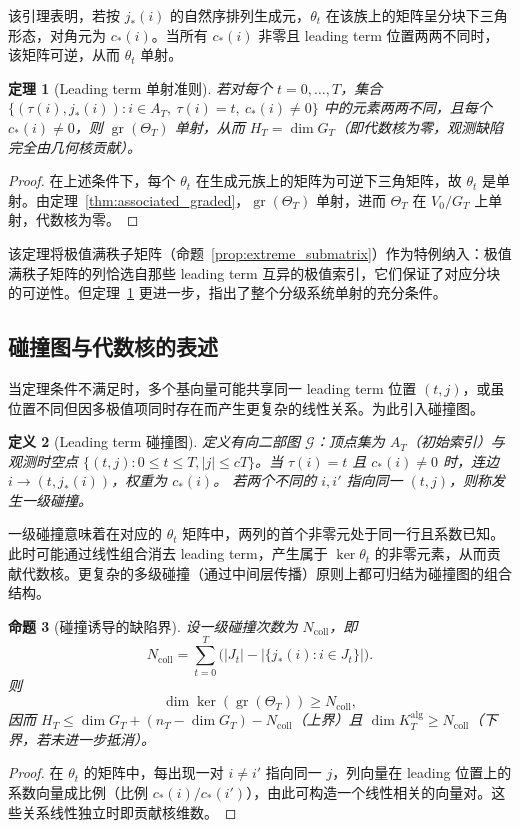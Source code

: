 \documentclass[11pt,a4paper]{ctexart}
\newtheorem{theorem}{定理}[section]
\newtheorem{proposition}[theorem]{命题}
\newtheorem{definition}[theorem]{定义}
\DeclareMathOperator{\gr}{gr}
\begin{document}
该引理表明，若按 \(j_*(i)\) 的自然序排列生成元，\(\theta_t\) 在该族上的矩阵呈分块下三角形态，对角元为 \(c_*(i)\)。当所有 \(c_*(i)\) 非零且 leading term 位置两两不同时，该矩阵可逆，从而 \(\theta_t\) 单射。

\begin{theorem}[Leading term 单射准则]\label{thm:leading_term_injective}
若对每个 \(t=0,\dots,T\)，集合 \(\{ (\tau(i), j_*(i)) : i\in A_T,\ \tau(i)=t,\ c_*(i)\neq0\}\) 中的元素两两不同，且每个 \(c_*(i)\neq0\)，则 \(\gr(\Theta_T)\) 单射，从而 \(H_T = \dim G_T\)（即代数核为零，观测缺陷完全由几何核贡献）。
\end{theorem}
\begin{proof}
在上述条件下，每个 \(\theta_t\) 在生成元族上的矩阵为可逆下三角矩阵，故 \(\theta_t\) 是单射。由定理~\ref{thm:associated_graded}，\(\gr(\Theta_T)\) 单射，进而 \(\Theta_T\) 在 \(V_0/G_T\) 上单射，代数核为零。
\end{proof}

该定理将极值满秩子矩阵（命题~\ref{prop:extreme_submatrix}）作为特例纳入：极值满秩子矩阵的列恰选自那些 leading term 互异的极值索引，它们保证了对应分块的可逆性。但定理~\ref{thm:leading_term_injective} 更进一步，指出了整个分级系统单射的充分条件。

\subsection{碰撞图与代数核的表述}
当定理条件不满足时，多个基向量可能共享同一 leading term 位置 \((t,j)\)，或虽位置不同但因多极值项同时存在而产生更复杂的线性关系。为此引入碰撞图。

\begin{definition}[Leading term 碰撞图]
定义有向二部图 \(\mathcal{G}\)：顶点集为 \(A_T\)（初始索引）与观测时空点 \(\{(t,j): 0\le t\le T, |j|\le cT\}\)。当 \(\tau(i)=t\) 且 \(c_*(i)\neq0\) 时，连边 \(i \to (t, j_*(i))\)，权重为 \(c_*(i)\)。
若两个不同的 \(i,i'\) 指向同一 \((t,j)\)，则称发生\emph{一级碰撞}。
\end{definition}

一级碰撞意味着在对应的 \(\theta_t\) 矩阵中，两列的首个非零元处于同一行且系数已知。此时可能通过线性组合消去 leading term，产生属于 \(\ker\theta_t\) 的非零元素，从而贡献代数核。更复杂的多级碰撞（通过中间层传播）原则上都可归结为碰撞图的组合结构。

\begin{proposition}[碰撞诱导的缺陷界]\label{prop:collision_bound}
设一级碰撞次数为 \(N_{\mathrm{coll}}\)，即
\[
N_{\mathrm{coll}} = \sum_{t=0}^T \bigl( |J_t| - |\{j_*(i): i\in J_t\}| \bigr).
\]
则
\[
\dim\ker(\gr(\Theta_T)) \ge N_{\mathrm{coll}},
\]
因而 \(H_T \le \dim G_T + (n_T - \dim G_T) - N_{\mathrm{coll}}\)（上界）且 \(\dim K_T^{\mathrm{alg}} \ge N_{\mathrm{coll}}\)（下界，若未进一步抵消）。
\end{proposition}
\begin{proof}
在 \(\theta_t\) 的矩阵中，每出现一对 \(i\neq i'\) 指向同一 \(j\)，列向量在 leading 位置上的系数向量成比例（比例 \(c_*(i)/c_*(i')\)），由此可构造一个线性相关的向量对。这些关系线性独立时即贡献核维数。
\end{proof}
\end{document}
